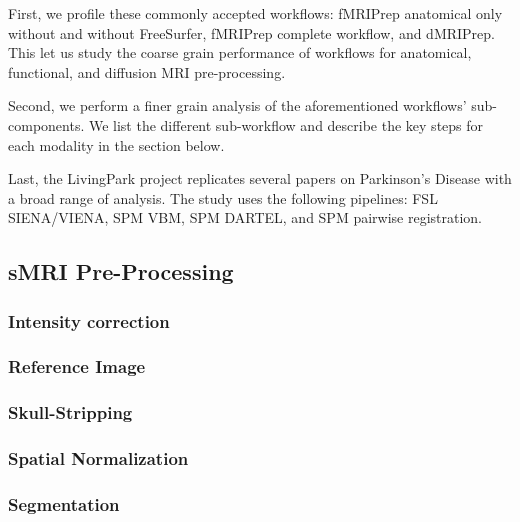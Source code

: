 \documentclass[conference]{IEEEtran}
\begin{document}
First, we profile these commonly accepted workflows: fMRIPrep anatomical only without and without FreeSurfer, fMRIPrep complete workflow, and dMRIPrep. This let us study the coarse grain performance of workflows for anatomical, functional, and diffusion MRI pre-processing.

Second, we perform a finer grain analysis of the aforementioned workflows' sub-components. We list the different sub-workflow and describe the key steps for each modality in the section below.

Last, the LivingPark project replicates several papers on Parkinson's Disease with a broad range of analysis. The study uses the following pipelines: FSL SIENA/VIENA, SPM VBM, SPM DARTEL, and SPM pairwise registration.

\subsection{sMRI Pre-Processing}
\subsubsection{Intensity correction}

\subsubsection{Reference Image}


\subsubsection{Skull-Stripping}


\subsubsection{Spatial Normalization}


\subsubsection{Segmentation}
\end{document}
